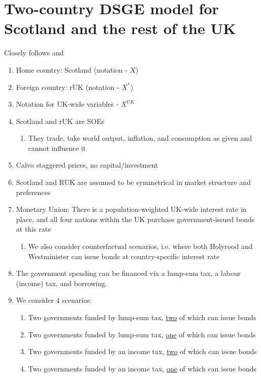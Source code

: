 \section*{Two-country DSGE model for Scotland and the rest of the UK}

Closely follows \textcite{jordigal_2015_monetary} and \textcite{gali_2005_monetary}
\begin{enumerate}
    \item Home country: Scotland (notation - $X$)
    \item Foreign country: rUK (notation - $X^*$)
    \item Notation for UK-wide variables - $X^{UK}$
    \item  Scotland and rUK are SOEs
          \begin{enumerate}
              \item They trade, take world output, inflation, and consumption as given and cannot influence it
          \end{enumerate}
    \item Calvo staggered prices, no capital/investment
    \item Scotland and RUK are assumed to be symmetrical in market structure and preferences
    \item Monetary Union: There is a population-weighted UK-wide interest rate in place, and all four nations within the UK purchase government-issued bonds at this rate
    \begin{enumerate}
        \item We also consider counterfactual scenarios, i.e. where both Holyrood and Westminister can issue bonds at country-specific interest rate
    \end{enumerate}
    \item The government spending can be financed via a lump-sum tax, a labour (income) tax, and borrowing.
    \item We consider 4 scenarios:
    \begin{enumerate}
        \item Two governments funded by lump-sum tax, \underline{two} of which can issue bonds
        \item Two governments funded by lump-sum tax, \underline{one} of which can issue bonds
        \item Two governments funded by an income tax, \underline{two} of which can issue bonds
        \item Two governments funded by an income tax, \underline{one} of which can issue bonds
    \end{enumerate}
\end{enumerate}

